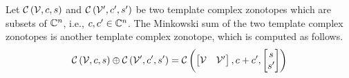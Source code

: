 \begin{proposition}
Let $\mathit{\mathcal{C}}\left(\mathcal{V},c,s\right)$ and
$\mathit{\mathcal{C}}\left(\mathcal{V}^\prime,c^\prime,s^\prime\right)$ be two template complex
zonotopes which are subsets of $\mathbb{C}^n$, i.e.,
$c,c^\prime\in\mathbb{C}^n$.  The Minkowski sum of the two
template complex zonotopes is another template complex zonotope,
which is computed as follows.
%
\begin{equation}
\mathit{\mathcal{C}}\left(\mathcal{V},c,s\right)\oplus \mathit{\mathcal{C}}\left(\mathcal{V}^\prime,c^\prime,s^\prime\right)
= \mathit{\mathcal{C}}\left(\begin{bmatrix}\mathcal{V} & \mathcal{V}^\prime\end{bmatrix},c+c^\prime,\begin{bmatrix}s\\s^\prime\end{bmatrix}\right)
\end{equation}
\end{proposition}
%

